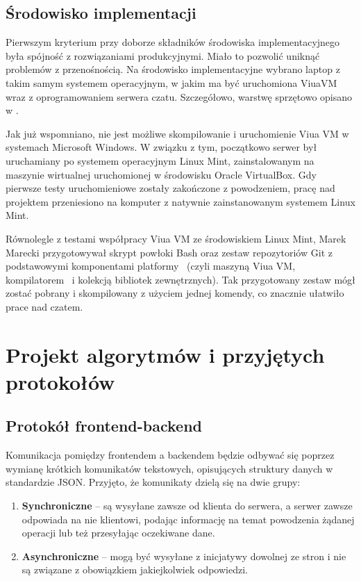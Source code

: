 \subsection{Środowisko implementacji}
Pierwszym kryterium przy doborze składników środowiska implementacyjnego była
spójność z rozwiązaniami produkcyjnymi. Miało to pozwolić uniknąć problemów
z przenośnością. Na środowisko implementacyjne wybrano laptop z takim samym
systemem operacyjnym, w jakim ma być uruchomiona ViuaVM wraz z oprogramowaniem
serwera czatu. Szczegółowo, warstwę sprzętowo opisano w .

Jak już wspomniano, nie jest możliwe skompilowanie i uruchomienie Viua
VM w systemach Microsoft Windows. W związku z tym, początkowo serwer był
uruchamiany po systemem operacyjnym Linux Mint, zainstalowanym na maszynie
wirtualnej uruchomionej w środowisku Oracle VirtualBox. Gdy pierwsze testy
uruchomieniowe zostały zakończone z powodzeniem, pracę nad projektem
przeniesiono na komputer z natywnie zainstanowanym systemem Linux Mint.

Równolegle z testami współpracy Viua VM ze środowiskiem Linux Mint, Marek
Marecki przygotowywał skrypt powłoki Bash oraz zestaw repozytoriów Git z
podstawowymi komponentami platformy \ViuAct\ (czyli maszyną Viua VM, kompilatorem
\ViuAct\ i kolekcją bibliotek zewnętrznych). Tak przygotowany zestaw mógł zostać
pobrany i skompilowany z użyciem jednej komendy, co znacznie ułatwiło prace
nad czatem.

\section{Projekt algorytmów i przyjętych protokołów}

\subsection{Protokół frontend-backend}
Komunikacja pomiędzy frontendem a backendem będzie odbywać się poprzez wymianę
krótkich komunikatów tekstowych, opisujących struktury danych w standardzie
JSON. Przyjęto, że komunikaty dzielą się na dwie grupy:

\begin{enumerate}
	\item \textbf{Synchroniczne} -- są wysyłane zawsze od klienta do serwera, a
	serwer zawsze odpowiada na nie klientowi, podając informację na temat
	powodzenia żądanej operacji lub też przesyłając oczekiwane dane.

	\item \textbf{Asynchroniczne} -- mogą być wysyłane z inicjatywy dowolnej ze
	stron i nie są związane z obowiązkiem jakiejkolwiek odpowiedzi.
\end{enumerate}

